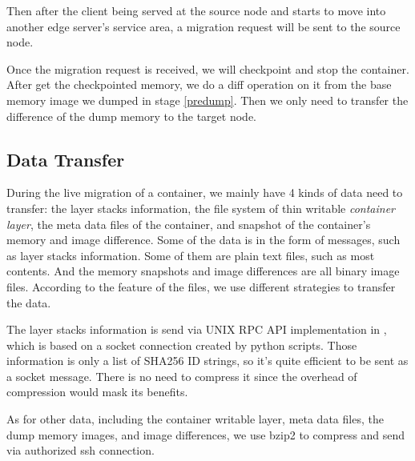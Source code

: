 Then after the client being served at the source node and starts to move into another edge server's service area, a migration request will be sent to the source node. 

Once the migration request is received, we will  checkpoint and stop the container. After get the checkpointed memory, we do a diff operation on it from the base memory image we dumped in stage \ref{predump}. 
Then we only need to transfer the difference of the dump memory to the target node. 



\subsection{Data Transfer}\label{design:compression}

During the live migration of a container, we mainly have 4 kinds of data need to transfer:
the layer stacks information, the file system of thin writable \textit{container layer}, the meta data files of the container, and snapshot of the container's memory and image difference. Some of the data is in the form of messages, such as layer stacks information. Some of them are plain text files, such as most contents. And the memory snapshots and image differences are all binary image files. According to the feature of the files, we use different strategies to transfer the data.

The layer stacks information is send via UNIX RPC API implementation in \cite{phaul}, which is based on a socket connection created by python scripts. Those information is only a list of SHA256 ID strings, so it's quite efficient to be sent as a socket message. There is no need to compress it since the overhead of compression would mask its benefits.

As for other data, including the container writable layer, meta data files, the dump memory images, and image differences, we use bzip2 to compress and send via authorized ssh connection.



